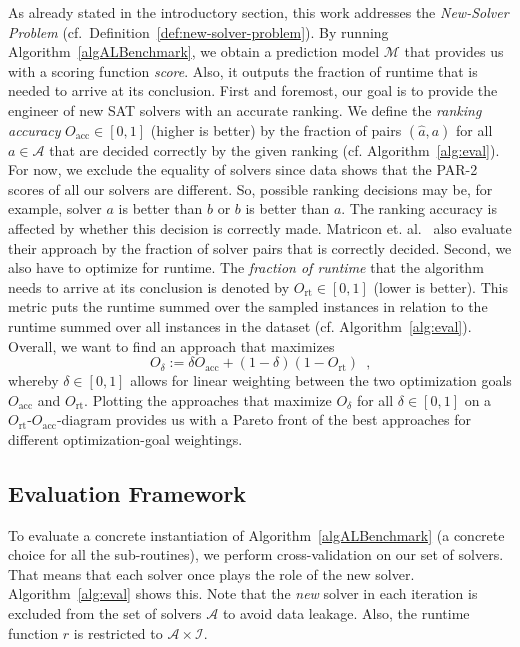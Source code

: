 \documentclass[runningheads]{llncs}
\begin{document}
As already stated in the introductory section, this work addresses the \emph{New-Solver Problem} (cf.~Definition~\ref{def:new-solver-problem}).
By running Algorithm~\ref{algALBenchmark}, we obtain a prediction model $\mathcal{M}$ that provides us with a scoring function \emph{score}.
Also, it outputs the fraction of runtime that is needed to arrive at its conclusion.
First and foremost, our goal is to provide the engineer of new SAT solvers with an accurate ranking.
We define the \emph{ranking accuracy} $O_{\operatorname{acc}} \in \left[0, 1\right]$ (higher is better) by the fraction of pairs $\left(\hat{a}, a\right)$ for all $a \in \mathcal{A}$ that are decided correctly by the given ranking (cf. Algorithm~\ref{alg:eval}).
For now, we exclude the equality of solvers since data shows that the PAR-2 scores of all our solvers are different.
So, possible ranking decisions may be, for example, solver $a$ is better than $b$ or $b$ is better than $a$.
The ranking accuracy is affected by whether this decision is correctly made.
Matricon et. al.~\cite{MatriconAFSH21} also evaluate their approach by the fraction of solver pairs that is correctly decided.
Second, we also have to optimize for runtime.
The \emph{fraction of runtime} that the algorithm needs to arrive at its conclusion is denoted by $O_{\operatorname{rt}} \in \left[0, 1\right]$ (lower is better).
This metric puts the runtime summed over the sampled instances in relation to the runtime summed over all instances in the dataset (cf. Algorithm~\ref{alg:eval}).
Overall, we want to find an approach that maximizes
%
\begin{equation}
  O_\delta := \delta O_{\operatorname{acc}} + \left(1 - \delta\right) \left(1 - O_{\operatorname{rt}}\right) \enspace \textrm{,}
  \label{eq:opt}
\end{equation} 
%
whereby $\delta \in \left[0, 1\right]$ allows for linear weighting between the two optimization goals $O_{\operatorname{acc}}$ and $O_{\operatorname{rt}}$.
Plotting the approaches that maximize $O_\delta$ for all $\delta \in \left[0, 1\right]$ on a $O_{\operatorname{rt}}$-$O_{\operatorname{acc}}$-diagram provides us with a Pareto front of the best approaches for different optimization-goal weightings.

\subsection{Evaluation Framework}
\label{sec:evalframe}

To evaluate a concrete instantiation of Algorithm~\ref{algALBenchmark} (a concrete choice for all the sub-routines), we perform cross-validation on our set of solvers.
That means that each solver once plays the role of the new solver.
Algorithm~\ref{alg:eval} shows this.
Note that the \emph{new} solver in each iteration is excluded from the set of solvers $\mathcal{A}$ to avoid data leakage.
Also, the runtime function $r$ is restricted to $\mathcal{A} \times \mathcal{I}$.
\end{document}
